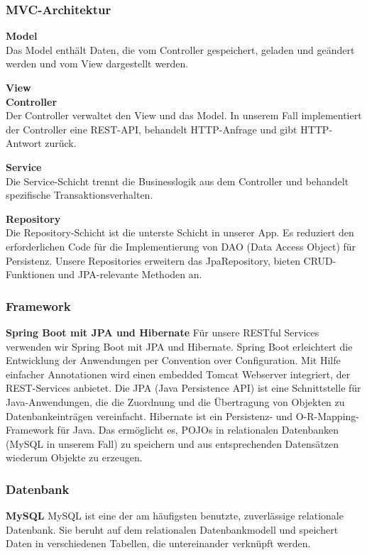 
\subsubsection{MVC-Architektur}

\textbf{Model} \\
Das Model enthält Daten, die vom Controller gespeichert, geladen und geändert werden und vom View dargestellt werden. 

\textbf{View}\\



\textbf{Controller}\\
Der Controller verwaltet den View und das Model. In unserem Fall implementiert der Controller eine REST-API, behandelt HTTP-Anfrage und gibt HTTP-Antwort zurück.


\textbf{Service}\\
Die Service-Schicht trennt die Businesslogik aus dem Controller und behandelt spezifische Transaktionsverhalten.

\textbf{Repository}\\ 
Die Repository-Schicht ist die unterste Schicht in unserer App. Es reduziert den erforderlichen Code für die Implementierung von DAO (Data Access Object) für Persistenz. Unsere Repositories erweitern das JpaRepository, bieten CRUD-Funktionen und JPA-relevante Methoden an.

 \subsubsection{Framework}

\textbf{Spring Boot mit JPA und Hibernate}
Für unsere RESTful Services verwenden wir Spring Boot mit JPA und Hibernate. 
Spring Boot erleichtert die Entwicklung der Anwendungen per Convention over Configuration. Mit Hilfe einfacher Annotationen wird einen embedded Tomcat Webserver integriert, der REST-Services anbietet.
Die JPA (Java Persistence API) ist eine Schnittstelle für Java-Anwendungen, die die Zuordnung und die Übertragung von Objekten zu Datenbankeinträgen vereinfacht.
Hibernate ist ein Persistenz- und O-R-Mapping-Framework für Java. Das ermöglicht es, POJOs in relationalen Datenbanken (MySQL in unserem Fall) zu speichern und aus entsprechenden Datensätzen wiederum Objekte zu erzeugen.

\subsubsection{Datenbank}
\textbf{MySQL}
MySQL ist eine der am häufigsten benutzte, zuverlässige relationale Datenbank. Sie beruht auf dem relationalen Datenbankmodell und speichert Daten in verschiedenen Tabellen, die untereinander verknüpft werden. 
